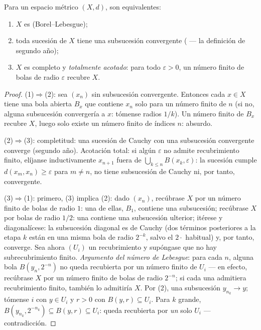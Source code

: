 \begin{theorem}
\label{thm:b3:topology:metriccompact}
Para un espacio métrico $(X, d)$, son equivalentes:
\begin{enumerate}
  \item $X$ es 
  (Borel--Lebesgue); \item toda sucesión de $X$ tiene una subsucesión
  convergente ( --- la definición de segundo año); \item $X$ es completo y
  \emph{totalmente acotado}: para todo $\varepsilon > 0$, un número
  finito de bolas de radio $\varepsilon$ recubre $X$.
\end{enumerate}
\end{theorem}

\begin{proof}
(1)$\Rightarrow$(2): sea $(x_n)$ sin subsucesión convergente. Entonces
cada $x \in X$ tiene una bola abierta $B_x$ que contiene $x_n$ solo para
un número finito de $n$ (si no, alguna subsucesión convergería a $x$:
tómense radios $1/k$). Un número finito de $B_x$ recubre $X$, luego solo
existe un número finito de índices $n$: absurdo.

(2)$\Rightarrow$(3): completitud: una sucesión de Cauchy con una
subsucesión convergente converge (segundo año). Acotación total: si
algún $\varepsilon$ no admite recubrimiento finito, elíjanse
inductivamente $x_{n+1}$ fuera de
$\bigcup_{k\leq n} B(x_k, \varepsilon)$: la sucesión cumple
$d(x_m, x_n) \geq \varepsilon$ para $m \neq n$, no tiene subsucesión de
Cauchy ni, por tanto, convergente.

(3)$\Rightarrow$(1): primero, (3) implica (2): dado $(x_n)$, recúbrase
$X$ por un número finito de bolas de radio $1$: una de ellas, $B_1$,
contiene una subsucesión; recúbrase $X$ por bolas de radio $1/2$: una
contiene una subsucesión ulterior; itérese y diagonalícese: la
subsucesión diagonal es de Cauchy (dos términos posteriores a la etapa
$k$ están en una misma bola de radio $2^{-k}$, salvo el $2\cdot$
habitual) y, por tanto, converge. Sea ahora $(U_i)$ un recubrimiento
 y supóngase que no hay subrecubrimiento finito. \emph{Argumento
del número de Lebesgue}: para cada $n$, alguna bola $B(y_n, 2^{-n})$ no
queda recubierta por un número finito de $U_i$ --- en efecto, recúbrase
$X$ por un número finito de bolas de radio $2^{-n}$; si cada una
admitiera recubrimiento finito, también lo admitiría $X$. Por (2), una
subsucesión $y_{n_k} \to y$; tómense $i$ con $y \in U_i$ y $r > 0$ con
$B(y, r) \subseteq U_i$. Para $k$ grande,
$B(y_{n_k}, 2^{-n_k}) \subseteq B(y, r) \subseteq U_i$: queda recubierta
por \emph{un} solo $U_i$ --- contradicción.
\end{proof}

